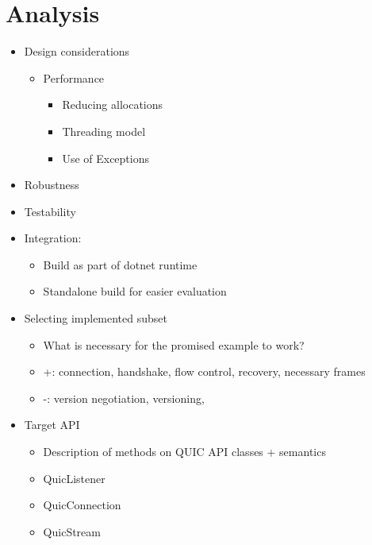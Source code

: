 \chapter{Analysis}
\begin{itemize}

    \item Design considerations
    \begin{itemize}

        \item Performance
        \begin{itemize}

            \item Reducing allocations
            \item Threading model
            \item Use of Exceptions

        \end{itemize}

    \end{itemize}

    \item Robustness
    \item Testability

    \item Integration:
    \begin{itemize}

        \item Build as part of dotnet runtime
        \item Standalone build for easier evaluation

    \end{itemize}

    \item Selecting implemented subset
    \begin{itemize}

        \item What is necessary for the promised example to work?
        \item +: connection, handshake, flow control, recovery, necessary frames
        \item -: version negotiation, versioning,

    \end{itemize}

    \item Target API
    \begin{itemize}

        \item Description of methods on QUIC API classes + semantics
        \item QuicListener
        \item QuicConnection
        \item QuicStream


\end{itemize}
\end{itemize}
